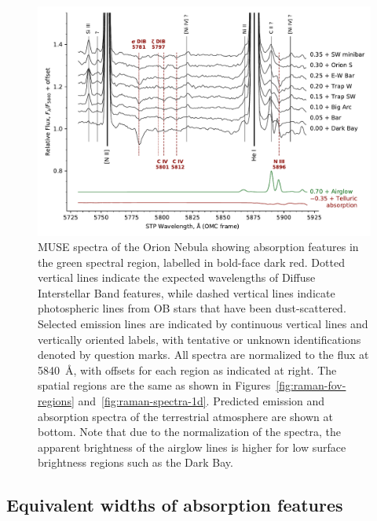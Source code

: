 \documentclass[useAMS, usenatbib, a4paper]{mnras}
\begin{document}
\begin{figure}
  \centering
  \includegraphics[width=\linewidth]{figs/dib-orion-muse-1d-spectra}
  \caption{
    MUSE spectra of the Orion Nebula showing absorption features
    in the green spectral region,
    labelled in bold-face dark red.
    Dotted vertical lines indicate the expected wavelengths of
    Diffuse Interstellar Band features,
    while dashed vertical lines indicate
    photospheric lines from OB stars that have been dust-scattered. 
    Selected emission lines are indicated by continuous vertical lines
    and vertically oriented labels,
    with tentative or unknown identifications denoted by question marks.
    All spectra are normalized to the flux at \SI{5840}{\angstrom},
    with offsets for each region as indicated at right.
    The spatial regions are the same as shown in
    Figures~\ref{fig:raman-fov-regions} and~\ref{fig:raman-spectra-1d}.
    Predicted emission and absorption spectra of the terrestrial atmosphere
    are shown at bottom.
    Note that due to the normalization of the spectra,
    the apparent brightness of the airglow lines is higher for
    low surface brightness regions such as the Dark Bay.
  }
  \label{fig:dib-spectra}
\end{figure}

\subsection{Equivalent widths of absorption features}
\label{sec:equiv-widths-absorpt}
\end{document}
